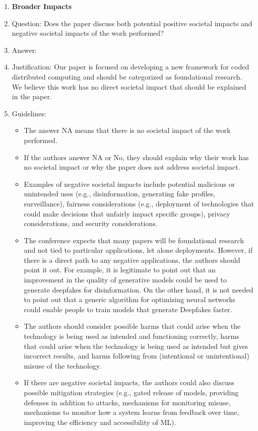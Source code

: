 \documentclass{article}
\begin{document}
\begin{enumerate}
\item {\bf Broader Impacts}
    \item[] Question: Does the paper discuss both potential positive societal impacts and negative societal impacts of the work performed?
    \item[] Answer: \answerNA{} %
    \item[] Justification: Our paper is focused on developing a new framework for coded distributed computing and should be categorized as foundational research. We believe this work has no direct societal impact that should be explained in the paper.
    \item[] Guidelines:
    \begin{itemize}
        \item The answer NA means that there is no societal impact of the work performed.
        \item If the authors answer NA or No, they should explain why their work has no societal impact or why the paper does not address societal impact.
        \item Examples of negative societal impacts include potential malicious or unintended uses (e.g., disinformation, generating fake profiles, surveillance), fairness considerations (e.g., deployment of technologies that could make decisions that unfairly impact specific groups), privacy considerations, and security considerations.
        \item The conference expects that many papers will be foundational research and not tied to particular applications, let alone deployments. However, if there is a direct path to any negative applications, the authors should point it out. For example, it is legitimate to point out that an improvement in the quality of generative models could be used to generate deepfakes for disinformation. On the other hand, it is not needed to point out that a generic algorithm for optimizing neural networks could enable people to train models that generate Deepfakes faster.
        \item The authors should consider possible harms that could arise when the technology is being used as intended and functioning correctly, harms that could arise when the technology is being used as intended but gives incorrect results, and harms following from (intentional or unintentional) misuse of the technology.
        \item If there are negative societal impacts, the authors could also discuss possible mitigation strategies (e.g., gated release of models, providing defenses in addition to attacks, mechanisms for monitoring misuse, mechanisms to monitor how a system learns from feedback over time, improving the efficiency and accessibility of ML).
    \end{itemize}
    

\end{enumerate}
\end{document}
